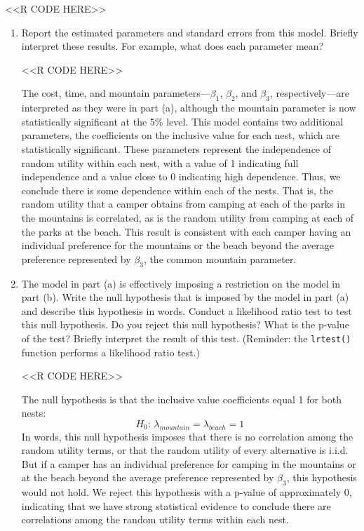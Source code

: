 \documentclass[11pt,letterpaper]{article}
\begin{document}
\begin{enumerate}[label=\alph*., leftmargin=*]
	<<R CODE HERE>>

	\begin{enumerate}[label=\roman*.]
		\item Report the estimated parameters and standard errors from this model. Briefly interpret these results. For example, what does each parameter mean?

		<<R CODE HERE>>

		The cost, time, and mountain parameters---$\beta_1$, $\beta_2$, and $\beta_3$, respectively---are interpreted as they were in part (a), although the mountain parameter is now statistically significant at the 5\% level. This model contains two additional parameters, the coefficients on the inclusive value for each nest, which are statistically significant. These parameters represent the independence of random utility within each nest, with a value of 1 indicating full independence and a value close to 0 indicating high dependence. Thus, we conclude there is some dependence within each of the nests. That is, the random utility that a camper obtains from camping at each of the parks in the mountains is correlated, as is the random utility from camping at each of the parks at the beach. This result is consistent with each camper having an individual preference for the mountains or the beach beyond the average preference represented by $\beta_3$, the common mountain parameter.

		\item The model in part (a) is effectively imposing a restriction on the model in part (b). Write the null hypothesis that is imposed by the model in part (a) and describe this hypothesis in words. Conduct a likelihood ratio test to test this null hypothesis. Do you reject this null hypothesis? What is the p-value of the test? Briefly interpret the result of this test. (Reminder: the \texttt{lrtest()} function performs a likelihood ratio test.)

		<<R CODE HERE>>

		The null hypothesis is that the inclusive value coefficients equal 1 for both nests:
		$$H_0 \text{: } \lambda_{mountain} = \lambda_{beach} = 1$$
		In words, this null hypothesis imposes that there is no correlation among the random utility terms, or that the random utility of every alternative is i.i.d. But if a camper has an individual preference for camping in the mountains or at the beach beyond the average preference represented by $\beta_3$, this hypothesis would not hold. We reject this hypothesis with a p-value of approximately 0, indicating that we have strong statistical evidence to conclude there are correlations among the random utility terms within each nest.


\end{enumerate}
\end{enumerate}
\end{document}
